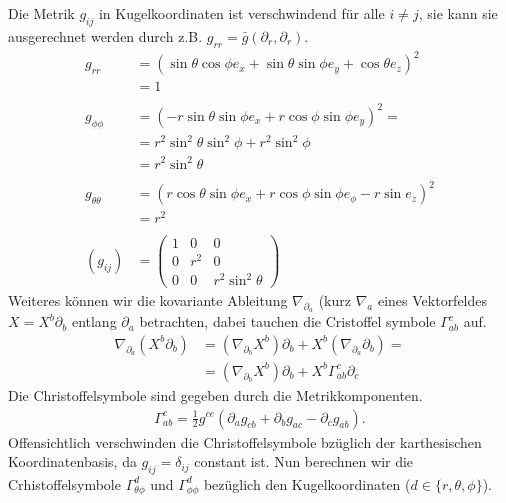 \documentclass[a4paper]{article}
\begin{document}
Die Metrik $g_{ij}$ in Kugelkoordinaten ist verschwindend für alle
$i\neq j$, sie kann sie ausgerechnet werden durch z.B. $g_{rr}
=\bar{g}(\partial_r, \partial_r)$.
\begin{align}
    g_{rr} &= (\sin\theta\cos\phi e_x  + \sin\theta\sin\phi e_y + \cos\theta e_z)^2\\
    &= 1\\
    \nonumber\\
    g_{\phi\phi} &= (-r\sin\theta\sin\phi e_x + r\cos\phi\sin\phi
    e_y)^2=\\
    &=r^2\sin^2\theta\sin^2\phi + r^2\sin^2\phi \\
    &=r^2 \sin^2\theta\\
    \nonumber\\
    g_{\theta\theta} &= (r\cos\theta\sin\phi e_x + r\cos\phi\sin\phi e_\phi -
    r\sin e_z)^2 \\
    &= r^2\\
    \nonumber\\
    (g_{ij}) &=
    \begin{pmatrix}
        1&0&0\\
        0&r^2&0\\
        0&0&r^2\sin^2\theta
    \end{pmatrix}
\end{align}
Weiteres können wir die kovariante Ableitung $\nabla_{\partial _a}$ (kurz
$\nabla _a$ eines
Vektorfeldes $X = X^b\partial _b$ entlang
$\partial _a$ betrachten, dabei tauchen die Cristoffel symbole
$\Gamma^c_{ab}$ auf.
\begin{align}
    \nabla_{\partial_a}(X^b\partial _b) &= (\nabla_{\partial_b}X^b)\partial_b
    + X^b(\nabla_{\partial_a}\partial_b) =\\
    &= (\nabla_{\partial_b}X^b)\partial_b + X^b\Gamma^c_{ab} \partial_c
\end{align}
Die Christoffelsymbole sind gegeben durch die Metrikkomponenten.
\begin{align}
    \Gamma^{c}_{ab} = \frac{1}{2} g^{ce}(\partial_a g_{cb} + \partial_b
    g_{ac} - \partial_c g_{ab}).
\end{align}
Offensichtlich verschwinden die Christoffelsymbole bzüglich der karthesischen
Koordinatenbasis, da $g_{ij} = \delta_{ij}$ constant ist. Nun berechnen wir
die Crhistoffelsymbole $\Gamma^{d}_{\theta\phi}$ und $\Gamma^{d}_{\phi\phi}$
bezüglich den Kugelkoordinaten ($d \in \{r, \theta, \phi\}$).
\end{document}
